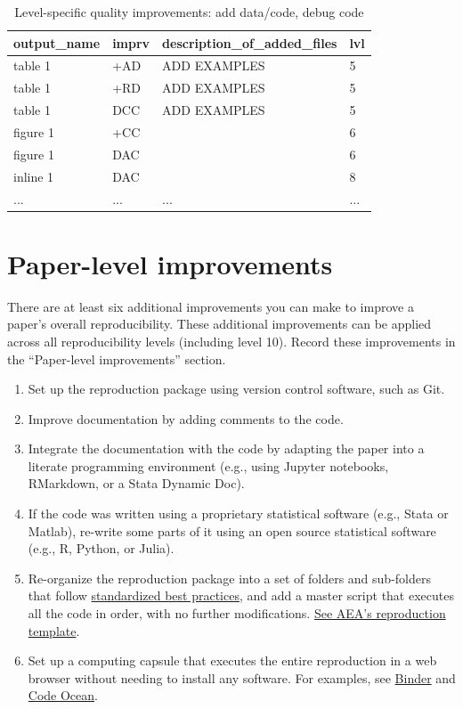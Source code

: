 \documentclass[]{book}
\providecommand{\tightlist}{%
  \setlength{\itemsep}{0pt}\setlength{\parskip}{0pt}}
\begin{document}
\begin{table}

\caption{\label{tab:improvements-spreadsheet}Level-specific quality improvements: add data/code, debug code}
\centering
\begin{tabular}[t]{l|l|l|l}
\hline
output\_name & imprv & description\_of\_added\_files & lvl\\
\hline
table 1 & +AD & ADD EXAMPLES & 5\\
\hline
table 1 & +RD & ADD EXAMPLES & 5\\
\hline
table 1 & DCC & ADD EXAMPLES & 5\\
\hline
figure 1 & +CC &  & 6\\
\hline
figure 1 & DAC &  & 6\\
\hline
inline 1 & DAC &  & 8\\
\hline
... & ... & ... & ...\\
\hline
\end{tabular}
\end{table}

\hypertarget{paper-level}{%
\section{Paper-level improvements}\label{paper-level}}

There are at least six additional improvements you can make to improve a paper's overall reproducibility. These additional improvements can be applied across all reproducibility levels (including level 10). Record these improvements in the ``Paper-level improvements'' section.

\begin{enumerate}
\def\labelenumi{\arabic{enumi}.}
\tightlist
\item
  Set up the reproduction package using version control software, such as Git.
\item
  Improve documentation by adding comments to the code.
\item
  Integrate the documentation with the code by adapting the paper into a literate programming environment (e.g., using Jupyter notebooks, RMarkdown, or a Stata Dynamic Doc).
\item
  If the code was written using a proprietary statistical software (e.g., Stata or Matlab), re-write some parts of it using an open source statistical software (e.g., R, Python, or Julia).
\item
  Re-organize the reproduction package into a set of folders and sub-folders that follow \href{https://www.projecttier.org/tier-protocol/specifications/\#overview-of-the-documentation}{standardized best practices}, and add a master script that executes all the code in order, with no further modifications. \href{https://github.com/AEADataEditor/replication-template}{See AEA's reproduction template}.\\
\item
  Set up a computing capsule that executes the entire reproduction in a web browser without needing to install any software. For examples, see \href{https://mybinder.org/}{Binder} and \href{https://codeocean.com/}{Code Ocean}.
\end{enumerate}
\end{document}
